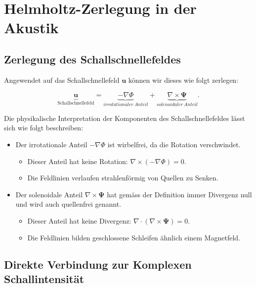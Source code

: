 %
%
%
%
\section{Helmholtz-Zerlegung in der Akustik
\label{helmholtz:section:Helmholtz_Zerlegung_Akustik}}


\subsection{Zerlegung des Schallschnellefeldes
\label{helmholtz:subsection:Zerlegung_Schallschnelle}}
Angewendet auf das Schallschnellefeld $\mathbf{u}$ können wir dieses wie folgt zerlegen:
 
\begin{equation}
\underbrace{\mathbf{u}}_{\text{Schallschnellefeld}} =  \underbrace{-\nabla \Phi}_{irrotationaler~Anteil} + \underbrace{\nabla \times \mathbf{\Psi}}_{solenoidaler~Anteil}.
\end{equation}
 
Die physikalische Interpretation der Komponenten des Schallschnellefeldes lässt sich wie folgt beschreiben:
 
\begin{itemize}
\item Der irrotationale Anteil $-\nabla \Phi$ ist wirbelfrei, da die Rotation verschwindet.
\begin{itemize}
\item Dieser Anteil hat keine Rotation: $\nabla \times (-\nabla \Phi) = 0$.
\item Die Feldlinien verlaufen strahlenförmig von Quellen zu Senken.
\end{itemize}
 
\item Der solenoidale Anteil $\nabla \times \mathbf{\Psi}$ hat gemäss der Definition immer Divergenz null und wird auch quellenfrei genannt.
\begin{itemize}
\item Dieser Anteil hat keine Divergenz: $\nabla \cdot (\nabla \times \mathbf{\Psi}) = 0$.
\item Die Feldlinien bilden geschlossene Schleifen ähnlich einem Magnetfeld.
\end{itemize}
\end{itemize}

\subsection{Direkte Verbindung zur Komplexen Schallintensität
\label{helmholtz:subsection:Zerlegung_Schallschnelle}}

